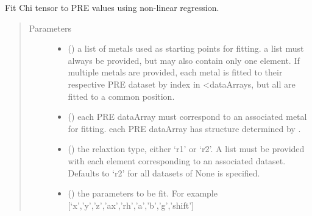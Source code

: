 \documentclass[a4paper,10pt,english,openany,oneside]{sphinxmanual}
\begin{document}
\begin{fulllineitems}
\label{\detokenize{reference/generated/paramagpy.fit.nlr_fit_metal_from_pre:paramagpy.fit.nlr_fit_metal_from_pre}}
Fit Chi tensor to PRE values using non-linear regression.
\begin{quote}\begin{description}
\item[{Parameters}] \leavevmode\begin{itemize}
\item {} 
 () \textendash{} a list of metals used as starting points for fitting.
a list must always be provided, but may also contain
only one element. If multiple metals are provided, each metal
is fitted to their respective PRE dataset by index in \textless{}dataArrays,
but all are fitted to a common position.

\item {} 
 () \textendash{} each PRE dataArray must correspond to an associated metal for fitting.
each PRE dataArray has structure determined by
{\hyperref[\detokenize{reference/generated/paramagpy.protein.CustomStructure.parse:paramagpy.protein.CustomStructure.parse}]{}}.

\item {} 
 (\sphinxstyleliteralemphasis{\sphinxupquote{, }}) \textendash{} the relaxtion type, either ‘r1’ or ‘r2’. A list must be provided with
each element corresponding to an associated dataset.
Defaults to ‘r2’ for all datasets of None is specified.

\item {} 
 () \textendash{} the parameters to be fit.
For example {[}‘x’,’y’,’z’,’ax’,’rh’,’a’,’b’,’g’,’shift’{]}


\end{itemize}
\end{description}
\end{quote}
\end{fulllineitems}
\end{document}
